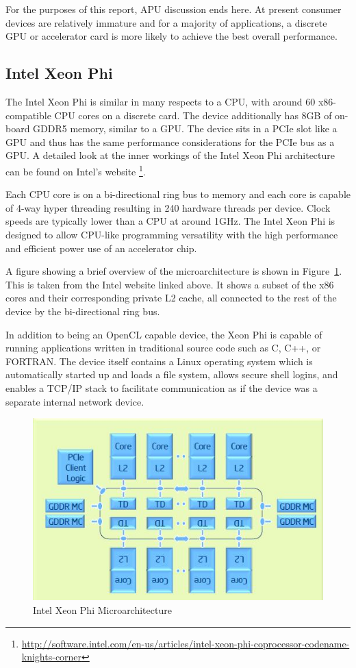 For the purposes of this report, APU discussion ends here. At present consumer
devices are relatively immature and for a majority of applications, a discrete
GPU or accelerator card is more likely to achieve the best overall performance.

\subsection{Intel Xeon Phi}

The Intel Xeon Phi is similar in many respects to a CPU, with around 60
x86-compatible CPU cores on a discrete card. The device additionally has 8GB of
on-board GDDR5 memory, similar to a GPU. The device sits in a PCIe slot like a
GPU and thus has the same performance considerations for the PCIe bus as a GPU.
A detailed look at the inner workings of the Intel Xeon Phi architecture can be
found on Intel's website
\footnote{\url{http://software.intel.com/en-us/articles/intel-xeon-phi-coprocessor-codename-knights-corner}}.

Each CPU core is on a bi-directional ring bus to memory and each core is capable
of 4-way hyper threading resulting in 240 hardware threads per device. Clock
speeds are typically lower than a CPU at around 1GHz. The Intel Xeon Phi is
designed to allow CPU-like programming versatility with the high performance and
efficient power use of an accelerator chip.

A figure showing a brief overview of the microarchitecture is shown in
Figure~\ref{fig:phiMicroarchitecture}. This is taken from the  Intel website linked
above. It shows a subset of the x86 cores and their corresponding private L2
cache, all connected to the rest of the device by the bi-directional ring bus.

In addition to being an OpenCL capable device, the Xeon Phi is capable of
running applications written in traditional source code such as C, C++, or
FORTRAN. The device itself contains a Linux operating system which is
automatically started up and loads a file system, allows secure shell logins,
and enables a TCP/IP stack to facilitate communication as if the device was a
separate internal network device.

\begin{figure}[H]
\includegraphics[width=\linewidth]{images/intelXeonPhiMicroarchitecture.jpg}
\caption{Intel Xeon Phi Microarchitecture}
\label{fig:phiMicroarchitecture}
\end{figure}

